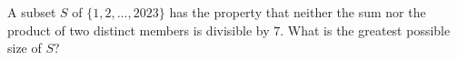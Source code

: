 A subset $S$ of $\{1,2,\ldots,2023\}$ has the property that neither the sum nor the product of two distinct members is divisible by $7$. What is the greatest possible size of $S$?
